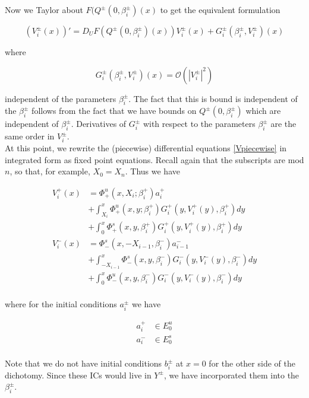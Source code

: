 \documentclass[12pt]{article}
\begin{document}
Now we Taylor about $F(Q^\pm(0, \beta_i^\pm)(x)$ to get the equivalent formulation

\begin{equation}\label{Vpiecewise}
(V_i^\pm(x))' = D_U F(Q^\pm(0, \beta_i^\pm)(x)) V_i^\pm(x)  + G_i^\pm(\beta_i^\pm, V_i^\pm)(x)
\end{equation}

where 

\begin{equation}\label{Gquadratic}
G_i^\pm(\beta_i^\pm, V_i^\pm)(x) = \mathcal{O}(|V_i^\pm|^2)
\end{equation}

independent of the parameters $\beta_i^\pm$. The fact that this is bound is independent of the $\beta_i^\pm$ follows from the fact that we have bounds on $Q^\pm(0, \beta_i^\pm)$ which are independent of $\beta_i^\pm$. Derivatives of $G_i^\pm$ with respect to the parameters $\beta_i^\pm$ are the same order in $V_i^\pm$.\\

At this point, we rewrite the (piecewise) differential equations \eqref{Vpiecewise} in integrated form as fixed point equations. Recall again that the subscripts are mod $n$, so that, for example, $X_0 = X_n$. Thus we have

\begin{align*}
V_i^+(x) &= \Phi^u_+(x, X_i; \beta_i^+) a_i^+  \\
&+ \int_{X_i}^x \Phi_+^u(x, y; \beta_i^+) G_i^+(y, V_i^+(y),\beta_i^+)dy \\
&+ \int_0^x \Phi_+^s(x, y, \beta_i^+) G_i^+(y, V_i^+(y),\beta_i^+)dy \\ 
V_i^-(x) &= \Phi^s_-(x, -X_{i-1}, \beta_i^-) a_{i-1}^-  \\
&+ \int_{-X_{i-1}}^x \Phi_-^s(x, y, \beta_i^-) G_i^-(y, V_i^-(y),\beta_i^-)dy \\
&+ \int_0^x \Phi_-^u(x, y, \beta_i^-) G_i^-(y, V_i^-(y),\beta_i^-)dy \\
\end{align*}

where for the initial conditions $a_i^\pm$ we have

\begin{align*}
a_i^+ &\in E_0^u \\
a_i^- &\in E_0^s \\
\end{align*}

Note that we do not have initial conditions $b_i^\pm$ at $x = 0$ for the other side of the dichotomy. Since these ICs would live in $Y^\pm$, we have incorporated them into the $\beta_i^\pm$.\\
\end{document}
